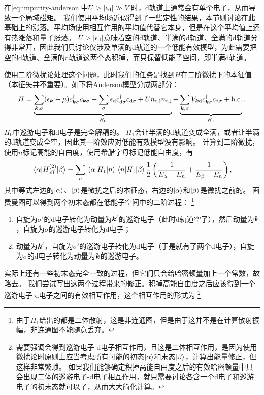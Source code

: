 \documentclass[hyperref, UTF8, a4paper]{ctexart}
\begin{document}
在\eqref{eq:impurity-anderson}中$U > \abs{\epsilon_\text{d}} \gg V$时，d轨道上通常会有单个电子，从而导致一个局域磁矩。
我们使用平均场近似得到了一些定性的结果，本节则讨论在此基础上的涨落。平均场使用相互作用的平均值代替它本身，但是在这个平均值上还有热涨落和量子涨落。
$U > \abs{\epsilon_\text{d}}$意味着空的d轨道、半满的d轨道、全满的d轨道分得非常开，因此我们只讨论仅涉及单满的d轨道的一个低能有效模型，为此需要把空的d轨道、全满的d轨道这两个态积掉，而只保留低能子空间，即半满d轨道。

使用二阶微扰论处理这个问题，此时我们的任务是找到${H}$在二阶微扰下的本征值（本征矢并不重要）。如下将Anderson模型分成两部分：
\[
    {H} = \underbrace{\sum_{\vb*{k}, \sigma} (\epsilon_{\vb*{k}} - \mu) {c}_{\vb*{k}\sigma}^\dagger {c}_{\vb*{k} \sigma} + \sum_\sigma \epsilon_\text{d} {c}_{\text{d}\sigma}^\dagger {c}_{\text{d} \sigma} + U {n}_{\text{d} \uparrow} {n}_{\text{d} \downarrow}}_{{H}_0} + \underbrace{\sum_{\vb*{k}, \sigma} V_{\vb*{k} \text{d}} {c}_{\vb*{k} \sigma}^\dagger {c}_{\text{d} \sigma} + \text{h.c.}}_{{H}_1}.
\]
${H}_0$中巡游电子和d电子是完全解耦的。
${H}_1$会让半满的d轨道变成全满，或者让半满的d轨道变成全空，因此其一阶效应对低能有效模型没有影响。
计算到二阶微扰，使用$n$标记高能的自由度，使用希腊字母标记低能自由度，有
\[
    \mel{\alpha}{{H}_\text{eff}^{(2)}}{\beta} = \sum_n \mel{\alpha}{{H}_1}{n} \mel{n}{{H}_1}{\beta} \frac{1}{2} \left( \frac{1}{E_\alpha - E_n} + \frac{1}{E_\beta - E_n} \right),
\]
其中等式左边的$\ket{\alpha}$、$\ket{\beta}$是微扰之后的本征态，右边的$\ket{\alpha}$和$\ket{\beta}$是微扰之前的。
画费曼图可以得到两个初末态都在低能子空间中的二阶过程：%
\footnote{由于${H}_1$给出的都是二体散射，这是非连通图，但是由于这并不是在计算散射振幅，非连通图不能随意丢弃。}%
\begin{enumerate}
    \item 自旋为$\sigma'$的d电子转化为动量为$\vb*{k}'$的巡游电子（此时d轨道空了），然后动量为$\vb*{k}$，自旋为$\sigma$的巡游电子转化为d电子；
    \item 动量为$\vb*{k}'$，自旋为$\sigma'$的巡游电子转化为d电子（于是就有了两个d电子），自旋为$\sigma$的d电子转化为动量为$\vb*{k}$的巡游电子。
\end{enumerate}
实际上还有一些初末态完全一致的过程，但它们只会给哈密顿量加上一个常数，故略去。
我们尝试写出这两个过程带来的修正。积掉高能自由度之后应该得到一个巡游电子-d电子之间的有效相互作用，这个相互作用的形式为%
\footnote{需要强调会得到巡游电子-d电子相互作用，且这是二体相互作用，是因为使用微扰论时原则上应当考虑所有可能的初态$\ket{\alpha}$和末态$\ket{\beta}$，计算出能量修正，但这样非常繁琐。
如果我们能够确定积掉高能自由度之后的有效哈密顿量中只会出现二体的巡游电子-d电子相互作用，就只需要讨论各含一个d电子和巡游电子的初末态就可以了，从而大大简化计算。
}%
\end{document}
